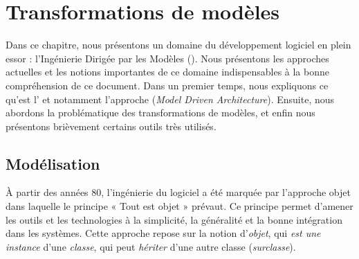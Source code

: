 \chapter{Transformations de modèles}
\label{ch:notions}

Dans ce chapitre, nous présentons un domaine du développement logiciel en plein
essor : l'Ingénierie Dirigée par les Modèles ({\idm}). Nous présentons les
approches actuelles et les notions importantes de ce domaine indispensables à
la bonne compréhension de ce document. Dans un premier temps, nous expliquons
ce qu'est l'{\idm} et notamment l'approche {\mda} (\emph{Model Driven
Architecture}). Ensuite, nous abordons la problématique des transformations de
modèles, et enfin nous présentons brièvement certains outils très utilisés.


\section{Modélisation}%


À partir des années 80, l'ingénierie du logiciel a été marquée par l'approche
objet dans laquelle le principe « Tout est objet » prévaut. Ce principe permet
d'amener les outils et les technologies à la simplicité, la généralité et la
bonne intégration dans les systèmes. Cette approche repose sur la notion
d'\emph{objet}, qui \emph{est une instance} d'une \emph{classe}, qui peut
\emph{hériter} d'une autre classe (\emph{surclasse}).

